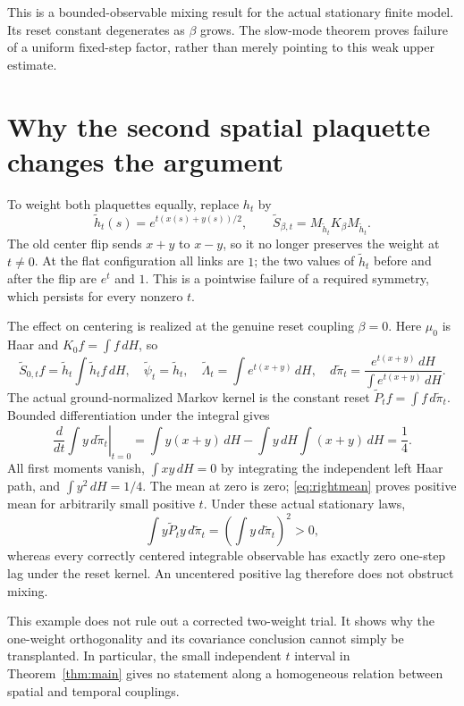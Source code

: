 \documentclass[11pt]{article}
\begin{document}
This is a bounded-observable mixing result for the actual stationary
finite model. Its reset constant degenerates as $\beta$ grows. The
slow-mode theorem proves failure of a uniform fixed-step factor,
rather than merely pointing to this weak upper estimate.

\section{Why the second spatial plaquette changes the argument}
\label{sec:homogeneous}
To weight both plaquettes equally, replace $h_t$ by
\[
 \widetilde h_t(s)=e^{t(x(s)+y(s))/2},\qquad
 \widetilde S_{\beta,t}=M_{\widetilde h_t}K_\beta M_{\widetilde h_t}.
\]
The old center flip sends $x+y$ to $x-y$, so it no longer preserves
the weight at $t\ne0$. At the flat configuration all links are $1$;
the two values of $\widetilde h_t$ before and after the flip are
$e^t$ and $1$. This is a pointwise failure of a required symmetry,
which persists for every nonzero $t$.

The effect on centering is realized at the genuine reset coupling
$\beta=0$. Here $\mu_0$ is Haar and $K_0f=\int f\,dH$, so
\[
 \widetilde S_{0,t}f=\widetilde h_t\int\widetilde h_tf\,dH,
 \quad\widetilde\psi_t=\widetilde h_t,
 \quad\widetilde\Lambda_t=\int e^{t(x+y)}\,dH,
 \quad d\widetilde\pi_t=
 \frac{e^{t(x+y)}\,dH}{\int e^{t(x+y)}\,dH}.
\]
The actual ground-normalized Markov kernel is the constant reset
$\widetilde P_t f=\int f\,d\widetilde\pi_t$.
Bounded differentiation under the integral gives
\begin{equation}\label{eq:rightmean}
 \left.\frac{d}{dt}\int y\,d\widetilde\pi_t\right|_{t=0}
 =\int y(x+y)\,dH-\int y\,dH\int(x+y)\,dH=\frac14.
\end{equation}
All first moments vanish, $\int xy\,dH=0$ by integrating the
independent left Haar path, and $\int y^2\,dH=1/4$.
The mean at zero is zero; \eqref{eq:rightmean} proves positive mean
for arbitrarily small positive $t$. Under these actual stationary laws,
\[
 \int y\widetilde P_ty\,d\widetilde\pi_t
 =\left(\int y\,d\widetilde\pi_t\right)^2>0,
\]
whereas every correctly centered integrable observable has exactly
zero one-step lag under the reset kernel. An uncentered positive lag
therefore does not obstruct mixing.

This example does not rule out a corrected two-weight trial. It shows
why the one-weight orthogonality and its covariance conclusion cannot
simply be transplanted. In particular, the small independent $t$
interval in Theorem~\ref{thm:main} gives no statement along a
homogeneous relation between spatial and temporal couplings.
\end{document}
